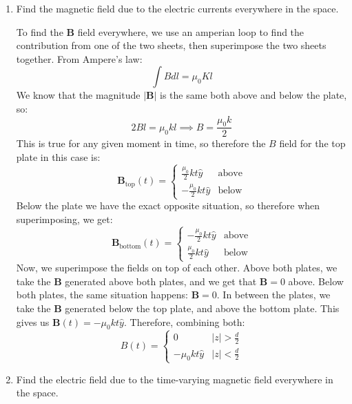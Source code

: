 \documentclass[10pt]{article}
\begin{document}
	\begin{enumerate}[label=\alph*)]
		\item Find the magnetic field due to the electric currents everywhere in the space.

			\begin{solution}
				To find the $\mathbf B$ field everywhere, we use an amperian loop to find the contribution from
				one of the two sheets, then superimpose the two sheets together. From Ampere's law:
				\[
				\int B dl = \mu_0 K l
				\] 
				We know that the magnitude $|\mathbf B|$ is the same both above and below the plate, so:
				\[
				2 Bl = \mu_0 k l \implies B = \frac{\mu_0 k}{2}
				\] 
				This is true for any given moment in time, so therefore the $B$ field for the top plate in 
				this case is:
				\[
					\mathbf B_{\text{top}}(t) = \begin{cases}
					\frac{\mu_0}{2}kt \hat{y} &\text{above}\\
					-\frac{\mu_0}{2}kt \hat{y} &\text{below}
				\end{cases}	
				\] 
				Below the plate we have the exact opposite situation, so therefore when superimposing, we get:
				\[
					\mathbf B_{\text{bottom}} (t) = \begin{cases}
						-\frac{\mu_0}{2}kt \hat{y} &\text{above}\\
						\frac{\mu_0}{2}kt \hat{y} &\text{below}
					\end{cases}
				\] 
				Now, we superimpose the fields on top of each other. Above both plates, we take the $\mathbf B$
				generated above both plates, and we get that $\mathbf B = 0$ above. Below both plates, the 
				same situation happens: $\mathbf B = 0$. In between the plates, we take the $\mathbf B$ generated
				below the top plate, and above the bottom plate. This gives us
				$\mathbf B(t) = -\mu_0 kt \hat{y}$. Therefore, combining both:
				\[
				B(t) = \begin{cases}
					0 & |z| > \frac{d}{2}\\
					-\mu_0 kt \hat{y} & |z| < \frac{d}{2}
				\end{cases}
				\] 
			\end{solution}
		\item Find the electric field due to the time-varying magnetic field everywhere in the space.


\end{enumerate}
\end{document}
